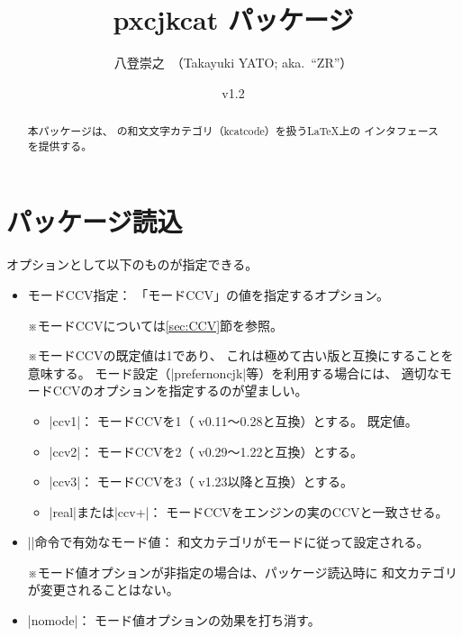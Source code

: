 \documentclass[uplatex,dvipdfmx,a4paper]{jsarticle}
\newenvironment{myverbatim}
  {\quote\small\verbatim}
  {\endverbatim\endquote}
\newcommand{\PkgVersion}{1.2}
\newcommand{\PkgDate}{2025/05/25}
\newcommand{\Pkg}[1]{\textsf{#1}}
\newcommand{\Note}{\par\noindent ※}
\newcommand{\Means}{：\quad}
\newcommand{\strong}{\textsf}
\begin{document}
\title{\Pkg{pxcjkcat} パッケージ}
\author{八登崇之\ （Takayuki YATO; aka.~``ZR''）}
\date{v\PkgVersion\quad[\PkgDate]}
\maketitle

\begin{abstract}
本パッケージは、
{\upTeX}の和文文字カテゴリ（kcatcode）を扱う{\LaTeX}上の
インタフェースを提供する。
\end{abstract}

\tableofcontents

\section{パッケージ読込}
\label{sec:Loading}

\begin{myverbatim}
\usepackage[<オプション>]{pxcjkcat}
\end{myverbatim}

オプションとして以下のものが指定できる。

\begin{itemize}
\item \strong{モードCCV指定}\Means
  \<「モードCCV」の値を指定するオプション。
  \Note モードCCVについては\ref{sec:CCV}節を参照。
  \Note モードCCVの既定値は1であり、
  これは極めて古い版と互換にすることを意味する。
  モード設定（|prefernoncjk|等）を利用する場合には、
  適切なモードCCVのオプションを指定するのが望ましい。
  \begin{itemize}
  \item |ccv1|\Means
    モードCCVを1（{\upTeX} v0.11～0.28と互換）とする。
    \strong{既定値。}
  \item |ccv2|\Means
    モードCCVを2（{\upTeX} v0.29～1.22と互換）とする。
  \item |ccv3|\Means
    モードCCVを3（{\upTeX} v1.23以降と互換）とする。
  \item |real|または|ccv+|\Means
    モードCCVをエンジンの実のCCVと一致させる。
  \end{itemize}
\item |\cjkcategorymode|\strong{命令で有効なモード値}\Means
  和文カテゴリがモードに従って設定される。
  \Note モード値オプションが非指定の場合は、パッケージ読込時に
  和文カテゴリが変更されることはない。
\item |nomode|\Means
  モード値オプションの効果を打ち消す。
\end{itemize}
\end{document}
